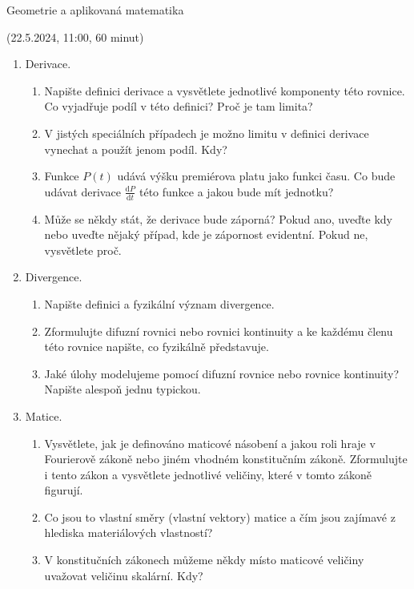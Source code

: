 \documentclass[12pt]{article}
\begin{document}
\begin{center}
  Geometrie a aplikovaná matematika

  (22.5.2024, 11:00, 60 minut)  
\end{center}

\begin{enumerate}

\item Derivace.
  \begin{enumerate}
  \item Napište definici derivace a vysvětlete jednotlivé komponenty této rovnice. Co vyjadřuje podíl v této definici? Proč je tam limita? 
\item V jistých speciálních případech je možno limitu v definici derivace vynechat a použít jenom podíl. Kdy?
\item Funkce $P(t)$ udává výšku premiérova platu jako funkci času. Co bude udávat derivace $\frac{\mathrm dP}{\mathrm d t}$ této funkce a jakou bude mít jednotku?
\item Může se někdy stát, že derivace bude záporná? Pokud ano, uveďte kdy nebo uveďte nějaký případ, kde je zápornost evidentní. Pokud ne, vysvětlete proč. 
\end{enumerate}
  
\item Divergence.
  \begin{enumerate}
  \item Napište definici a fyzikální význam divergence. 
  \item Zformulujte difuzní rovnici nebo rovnici kontinuity a ke
    každému členu této rovnice napište, co fyzikálně představuje.
  \item Jaké úlohy modelujeme pomocí difuzní rovnice nebo rovnice kontinuity? Napište alespoň jednu typickou.
\end{enumerate}
  

\item Matice.
  \begin{enumerate}
  \item Vysvětlete, jak je definováno maticové násobení a jakou roli
    hraje v Fourierově zákoně nebo jiném vhodném konstitučním
    zákoně. Zformulujte i tento zákon a vysvětlete jednotlivé
    veličiny, které v tomto zákoně figurují.
  \item Co jsou to vlastní směry (vlastní vektory) matice a čím jsou
    zajímavé z hlediska materiálových vlastností?
  \item V konstitučních zákonech můžeme někdy místo maticové veličiny
    uvažovat veličinu skalární. Kdy?
\end{enumerate}


\end{enumerate}
\end{document}
